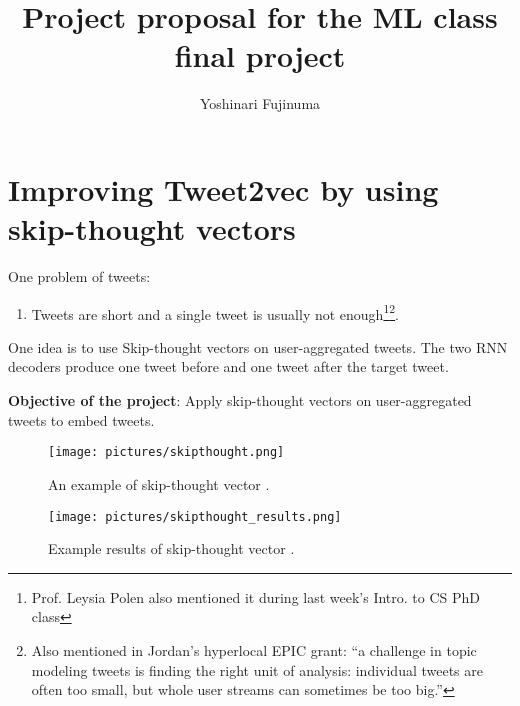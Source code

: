 \documentclass[11pt]{article}
\begin{document}
\vspace{-1cm}
\title{\vspace{-2ex}Project proposal for the ML class final project\vspace{-2ex}}
\author{Yoshinari Fujinuma\vspace{-2ex}}
\date{\vspace{-2ex}}
\maketitle

\vspace{-0.5cm}

\section{Improving Tweet2vec by using skip-thought vectors}

One problem of tweets:

\begin{enumerate}
 \setlength\itemsep{0.01em}
 \item Tweets are short and a single tweet is usually not enough\footnote{Prof. Leysia Polen also mentioned it during last week's Intro. to CS PhD class}\footnote{Also mentioned in Jordan's hyperlocal EPIC grant: ``a challenge in topic modeling tweets is finding the right unit of analysis: individual tweets are often too small, but whole user streams can sometimes be too big.''}.
\end{enumerate}

One idea is to use Skip-thought vectors \cite{kiros2015skip} on user-aggregated tweets. The two RNN decoders produce one tweet before and one tweet after the target tweet.

{\bf Objective of the project}: Apply skip-thought vectors on user-aggregated tweets to embed tweets.

\begin{figure}[htb]
  \begin{center}
     \scalebox{0.5}
      {\texttt{[image: pictures/skipthought.png]}}

      \caption{An example of skip-thought vector \cite{kiros2015skip}. }
      \label{fig:learning_rate}
     \end{center}
\vspace{-0.5cm}
\end{figure}

\begin{figure}[htb]
  \begin{center}
     \scalebox{0.5}
      {\texttt{[image: pictures/skipthought\_results.png]}}

      \caption{Example results of skip-thought vector \cite{kiros2015skip}. }
      \label{fig:learning_rate}
     \end{center}
\vspace{-0.5cm}
\end{figure}






\end{document}
